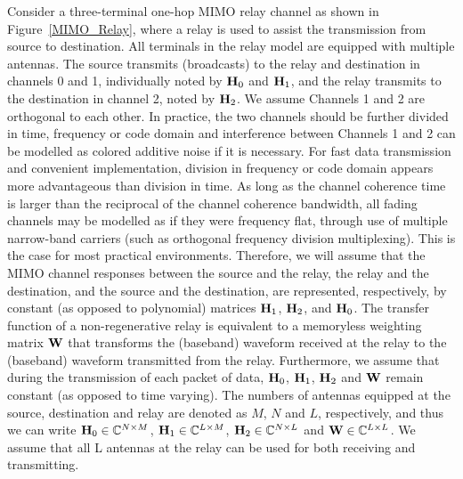 \documentclass[a4paper,10pt,fleqn, twocolumn]{IEEEtran}
\newcommand{\bH}{{\bf H}}
\newcommand{\bW}{{\bf W}}
\begin{document}
Consider a three-terminal one-hop MIMO relay channel as shown in
Figure~\ref{MIMO_Relay}, where a relay is used to assist the
transmission from source to destination. All terminals in the
relay model are equipped with multiple antennas. The source
transmits (broadcasts) to the relay and destination in channels 0
and 1, individually noted by $\bH_{0}$ and $\bH_{1}$, and the
relay transmits to the destination in channel 2, noted by
$\bH_{2}$. We assume Channels 1 and 2 are orthogonal to each
other. In practice, the two channels should be further divided in
time, frequency or code domain and interference between Channels 1
and 2 can be modelled as colored additive noise if it is
necessary. For fast data transmission and convenient
implementation, division in frequency or code domain appears more
advantageous than division in time. As long as the channel
coherence time is larger than the reciprocal of the channel
coherence bandwidth, all fading channels may be modelled as if
they were frequency flat, through use of multiple narrow-band
carriers (such as orthogonal frequency division multiplexing).
This is the case for most practical environments. Therefore, we
will assume that the MIMO channel responses between the source and
the relay, the relay and the destination, and the source and the
destination, are represented, respectively, by constant (as
opposed to polynomial) matrices $\bH_{1}$, $\bH_{2}$, and
$\bH_{0}$. The transfer function of a non-regenerative relay is
equivalent to a memoryless weighting matrix $\bW$ that transforms
the (baseband) waveform received at the relay to the (baseband)
waveform transmitted from the relay. Furthermore, we assume that
during the transmission of each packet of data, $\bH_{0}$,
$\bH_{1}$, $\bH_{2}$ and $\bW$ remain constant (as opposed to time
varying). The numbers of antennas equipped at the source,
destination and relay are denoted as $M$, $N$ and $L$,
respectively, and thus we can write $\bH_{0}\in\mathbb{C}^{N\times
M}$, $\bH_{1}\in\mathbb{C}^{L\times M}$,
$\bH_{2}\in\mathbb{C}^{N\times L}$ and $\bW\in\mathbb{C}^{L\times
L}$. We assume that all L antennas at the relay can be used for
both receiving and transmitting.

\begin{figure}
\end{figure}
\end{document}
